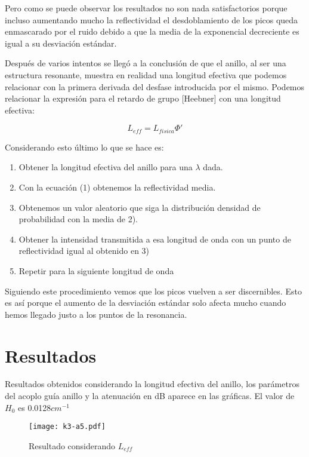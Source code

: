 \documentclass[oneside]{article}
\begin{document}
Pero como se puede observar los resultados no son nada satisfactorios porque
incluso aumentando mucho la reflectividad el desdoblamiento de los picos queda
enmascarado por el ruido debido a que la media de la exponencial decreciente
es igual a su desviación estándar.

Después de varios intentos se llegó a la conclusión de que el anillo, al  ser
una estructura resonante, muestra en realidad una longitud efectiva que podemos
relacionar con la primera derivada del desfase introducida por el mismo.
Podemos relacionar la expresión para el retardo de grupo [Heebner] con una
longitud efectiva:

\begin{equation}
   L_{eff}=L_{fisica} \Phi '
\end{equation}

Considerando esto último lo que se hace es:
\begin{enumerate}
\item Obtener la longitud efectiva del anillo para una $\lambda$ dada.
\item Con la ecuación (1) obtenemos la reflectividad media.
\item Obtenemos un valor aleatorio que siga la distribución densidad de
probabilidad con la media de 2).
\item Obtener la intensidad transmitida a esa longitud de onda con un punto de
reflectividad igual al obtenido en 3)
\item Repetir para la siguiente longitud de onda
\end{enumerate}

Siguiendo este procedimiento vemos que los picos vuelven a ser
discernibles. Esto es así porque el aumento de la desviación estándar solo
afecta mucho cuando hemos llegado justo a los puntos de la resonancia.

\section{Resultados}
Resultados obtenidos considerando la longitud efectiva del anillo, los parámetros
del acoplo guía anillo y la atenuación en dB aparece en las gráficas. El valor de
$H_0$ es 0.0128$cm^{-1}$

\begin{figure}[h]
    \centering
    \texttt{[image: k3-a5.pdf]}
    \caption{Resultado considerando $L_{eff}$}
    \label{r1g}
\end{figure}
\end{document}
